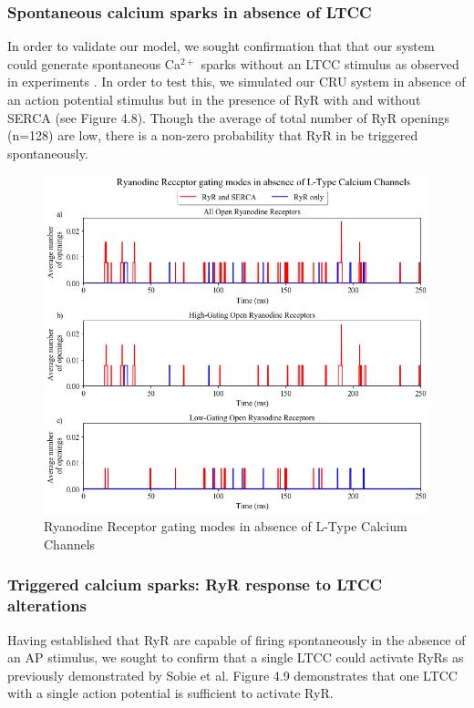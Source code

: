\documentclass[12pt]{ucsddissertation}
\begin{document}
\subsubsection{Spontaneous calcium sparks in absence of LTCC}

In order to validate our model, we sought confirmation that that our system could generate spontaneous Ca$^{2+}$ sparks without an LTCC stimulus as observed in experiments \cite{Cheng1993,Lopez-Lopez1994,Cannell1995}. In order to test this, we simulated our CRU system in absence of an action potential stimulus but in the presence of RyR with and without SERCA (see Figure 4.8). Though the average of total number of RyR openings (n=128) are low, there is a non-zero probability that RyR in be triggered spontaneously.

\setcounter{figure}{7}
\begin{figure}
	\includegraphics[scale=0.6]{buffer_fluo_RyR_r_Comparison.png}
	\caption{Ryanodine Receptor gating modes in absence of L-Type Calcium Channels} 
\label{fig:Buffer RyR} 
\end{figure}

\subsubsection{Triggered calcium sparks: RyR response to LTCC alterations}
Having established that RyR are capable of firing spontaneously in the absence of an AP stimulus, we sought to confirm that a single LTCC could activate RyRs as previously demonstrated by Sobie et al\cite{Sobie2002}. Figure 4.9 demonstrates that one LTCC with a single action potential is sufficient to activate RyR. 
\end{document}
